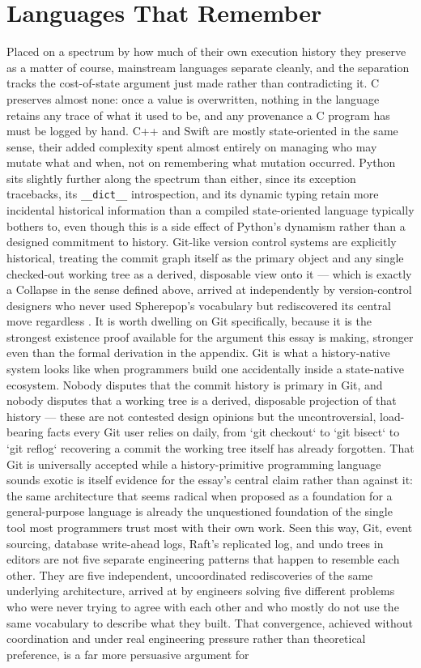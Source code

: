 \documentclass[11pt]{article}
\begin{document}
\section{Languages That Remember}

Placed on a spectrum by how much of their own execution history they preserve as a matter of course, mainstream languages separate cleanly, and the separation tracks the cost-of-state argument just made rather than contradicting it. C preserves almost none: once a value is overwritten, nothing in the language retains any trace of what it used to be, and any provenance a C program has must be logged by hand. C++ and Swift are mostly state-oriented in the same sense, their added complexity spent almost entirely on managing who may mutate what and when, not on remembering what mutation occurred. Python sits slightly further along the spectrum than either, since its exception tracebacks, its \texttt{\_\_dict\_\_} introspection, and its dynamic typing retain more incidental historical information than a compiled state-oriented language typically bothers to, even though this is a side effect of Python's dynamism rather than a designed commitment to history. Git-like version control systems are explicitly historical, treating the commit graph itself as the primary object and any single checked-out working tree as a derived, disposable view onto it --- which is exactly a Collapse in the sense defined above, arrived at independently by version-control designers who never used Spherepop's vocabulary but rediscovered its central move regardless \cite{chacon2014}. It is worth dwelling on Git specifically, because it is the strongest existence proof available for the argument this essay is making, stronger even than the formal derivation in the appendix. Git is what a history-native system looks like when programmers build one accidentally inside a state-native ecosystem. Nobody disputes that the commit history is primary in Git, and nobody disputes that a working tree is a derived, disposable projection of that history --- these are not contested design opinions but the uncontroversial, load-bearing facts every Git user relies on daily, from `git checkout` to `git bisect` to `git reflog` recovering a commit the working tree itself has already forgotten. That Git is universally accepted while a history-primitive programming language sounds exotic is itself evidence for the essay's central claim rather than against it: the same architecture that seems radical when proposed as a foundation for a general-purpose language is already the unquestioned foundation of the single tool most programmers trust most with their own work. Seen this way, Git, event sourcing, database write-ahead logs, Raft's replicated log, and undo trees in editors are not five separate engineering patterns that happen to resemble each other. They are five independent, uncoordinated rediscoveries of the same underlying architecture, arrived at by engineers solving five different problems who were never trying to agree with each other and who mostly do not use the same vocabulary to describe what they built. That convergence, achieved without coordination and under real engineering pressure rather than theoretical preference, is a far more persuasive argument for 
\end{document}

